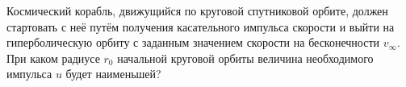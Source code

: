 Космический корабль, движущийся по круговой спутниковой орбите,
должен стартовать с неё путём получения касательного импульса скорости
и выйти на гиперболическую орбиту с заданным значением скорости
на бесконечности $v _{\infty}$.
При каком радиусе $r_0$ начальной круговой орбиты
величина необходимого импульса $u$ будет наименьшей?
